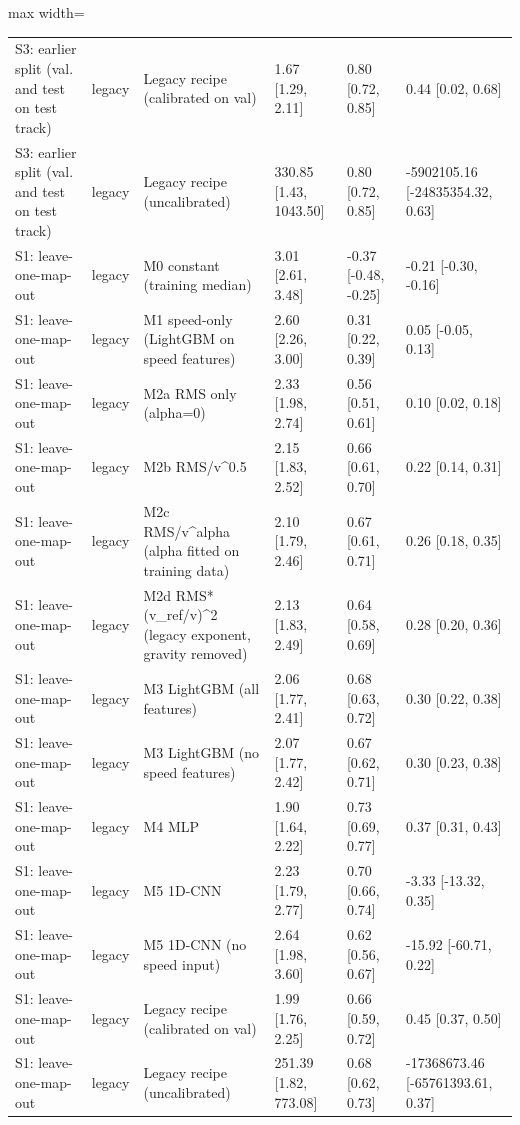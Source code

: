 \begin{table}[!htbp]
\begin{adjustbox}{max width=\columnwidth}
\begin{tabular}{>{\raggedright\arraybackslash}p{3.4cm}l>{\raggedright\arraybackslash}p{4.6cm}lll}
S3: earlier split (val. and test on test track) & legacy & Legacy recipe (calibrated on val) & 1.67 [1.29, 2.11] & 0.80 [0.72, 0.85] & 0.44 [0.02, 0.68] \\
S3: earlier split (val. and test on test track) & legacy & Legacy recipe (uncalibrated) & 330.85 [1.43, 1043.50] & 0.80 [0.72, 0.85] & -5902105.16 [-24835354.32, 0.63] \\
S1: leave-one-map-out & legacy & M0 constant (training median) & 3.01 [2.61, 3.48] & -0.37 [-0.48, -0.25] & -0.21 [-0.30, -0.16] \\
S1: leave-one-map-out & legacy & M1 speed-only (LightGBM on speed features) & 2.60 [2.26, 3.00] & 0.31 [0.22, 0.39] & 0.05 [-0.05, 0.13] \\
S1: leave-one-map-out & legacy & M2a RMS only (alpha=0) & 2.33 [1.98, 2.74] & 0.56 [0.51, 0.61] & 0.10 [0.02, 0.18] \\
S1: leave-one-map-out & legacy & M2b RMS/v\textasciicircum{}0.5 & 2.15 [1.83, 2.52] & 0.66 [0.61, 0.70] & 0.22 [0.14, 0.31] \\
S1: leave-one-map-out & legacy & M2c RMS/v\textasciicircum{}alpha (alpha fitted on training data) & 2.10 [1.79, 2.46] & 0.67 [0.61, 0.71] & 0.26 [0.18, 0.35] \\
S1: leave-one-map-out & legacy & M2d RMS*(v\_ref/v)\textasciicircum{}2 (legacy exponent, gravity removed) & 2.13 [1.83, 2.49] & 0.64 [0.58, 0.69] & 0.28 [0.20, 0.36] \\
S1: leave-one-map-out & legacy & M3 LightGBM (all features) & 2.06 [1.77, 2.41] & 0.68 [0.63, 0.72] & 0.30 [0.22, 0.38] \\
S1: leave-one-map-out & legacy & M3 LightGBM (no speed features) & 2.07 [1.77, 2.42] & 0.67 [0.62, 0.71] & 0.30 [0.23, 0.38] \\
S1: leave-one-map-out & legacy & M4 MLP & 1.90 [1.64, 2.22] & 0.73 [0.69, 0.77] & 0.37 [0.31, 0.43] \\
S1: leave-one-map-out & legacy & M5 1D-CNN & 2.23 [1.79, 2.77] & 0.70 [0.66, 0.74] & -3.33 [-13.32, 0.35] \\
S1: leave-one-map-out & legacy & M5 1D-CNN (no speed input) & 2.64 [1.98, 3.60] & 0.62 [0.56, 0.67] & -15.92 [-60.71, 0.22] \\
S1: leave-one-map-out & legacy & Legacy recipe (calibrated on val) & 1.99 [1.76, 2.25] & 0.66 [0.59, 0.72] & 0.45 [0.37, 0.50] \\
S1: leave-one-map-out & legacy & Legacy recipe (uncalibrated) & 251.39 [1.82, 773.08] & 0.68 [0.62, 0.73] & -17368673.46 [-65761393.61, 0.37] \\

\end{tabular}
\end{adjustbox}
\end{table}
